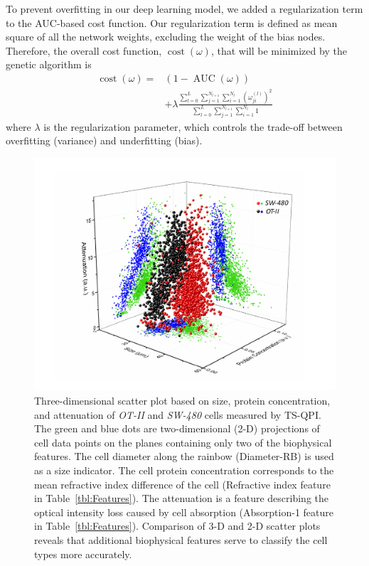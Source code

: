 \documentclass[aps,pra,reprint,superscriptaddress]{revtex4-1}
\DeclareMathOperator{\AUC}{AUC} %
\DeclareMathOperator{\cost}{cost} %
\begin{document}
To prevent overfitting in our deep learning model, we added a regularization term to the AUC-based cost function. Our regularization term is defined as mean square of all the network weights, excluding the weight of the bias nodes. Therefore, the overall cost function, $\cost(\omega)$, that will be minimized by the genetic algorithm is
\begin{equation}
\begin{split}
\cost(\omega) = & (1 - \AUC(\omega)) \\
& + \lambda \frac{\sum_{l=0}^{L} \sum_{j=1}^{N_{l+1}} \sum_{i=1}^{N_l} (\omega_{ji}^{(l)})^2}{\sum_{l=0}^{L} \sum_{j=1}^{N_{l+1}} \sum_{i=1}^{N_l} 1}
\end{split}
\end{equation}
where $\lambda$ is the regularization parameter, which controls the trade-off between overfitting (variance) and underfitting (bias).

\begin{figure}
\includegraphics[scale=0.6]{FigureOTSWScatter.pdf}
\caption{\label{fig:OTSWScatter} Three-dimensional scatter plot based on size, protein concentration, and attenuation of \textit{OT-II} and \textit{SW-480} cells measured by TS-QPI. The green and blue dots are two-dimensional (2-D) projections of cell data points on the planes containing only two of the biophysical features. The cell diameter along the rainbow (Diameter-RB) is used as a size indicator. The cell protein concentration corresponds to the mean refractive index difference of the cell (Refractive index feature in Table~\ref{tbl:Features}). The attenuation is a feature describing the optical intensity loss caused by cell absorption (Absorption-1 feature in Table~\ref{tbl:Features}). Comparison of 3-D and 2-D scatter plots reveals that additional biophysical features serve to classify the cell types more accurately.}
\end{figure}
\end{document}
